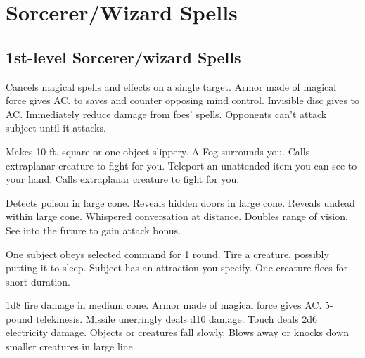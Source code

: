 \section{Sorcerer/Wizard Spells}
\subsection{1st-level Sorcerer/wizard Spells}
\begin{swspelllist}
   Cancels magical spells and effects on a single target.
   Armor made of magical force gives  AC.
    to saves and counter opposing mind control.
   Invisible disc gives  to AC.
   Immediately reduce damage from foes' spells.
   Opponents can't attack subject until it attacks.

   Makes 10 ft. square or one object slippery.
   A Fog surrounds you.
   Calls extraplanar creature to fight for you.
   Teleport an unattended item you can see to your hand.
   Calls extraplanar creature to fight for you.

   Detects poison in large cone.
   Reveals hidden doors in large cone.
   Reveals undead within large cone.
   Whispered conversation at distance.
   Doubles range of vision.
   See into the future to gain attack bonus.

   One subject obeys selected command for 1 round.
   Tire a creature, possibly putting it to sleep.
   Subject has an attraction you specify.
   One creature flees for short duration.

   1d8 fire damage in medium cone.
   Armor made of magical force gives  AC.
   5-pound telekinesis.
   Missile unerringly deals d10 damage.
   Touch deals 2d6 electricity damage.
   Objects or creatures fall slowly.
   Blows away or knocks down smaller creatures in large line.


\end{swspelllist}
